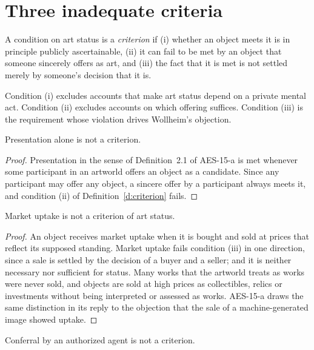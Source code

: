 \documentclass{situationist-preprint}
\begin{document}
\section{Three inadequate criteria}

\begin{definition}\label{d:criterion}
A condition on art status is a \emph{criterion} if (i) whether an object meets it is in principle publicly ascertainable, (ii) it can fail to be met by an object that someone sincerely offers as art, and (iii) the fact that it is met is not settled merely by someone's decision that it is.
\end{definition}

Condition (i) excludes accounts that make art status depend on a private mental act. Condition (ii) excludes accounts on which offering suffices. Condition (iii) is the requirement whose violation drives Wollheim's objection.

\begin{proposition}\label{p:pres}
Presentation alone is not a criterion.
\end{proposition}

\begin{proof}
Presentation in the sense of Definition~2.1 of AES-15-a is met whenever some participant in an artworld offers an object as a candidate. Since any participant may offer any object, a sincere offer by a participant always meets it, and condition (ii) of Definition~\ref{d:criterion} fails.
\end{proof}

\begin{proposition}\label{p:market}
Market uptake is not a criterion of art status.
\end{proposition}

\begin{proof}
An object receives market uptake when it is bought and sold at prices that reflect its supposed standing. Market uptake fails condition (iii) in one direction, since a sale is settled by the decision of a buyer and a seller; and it is neither necessary nor sufficient for status. Many works that the artworld treats as works were never sold, and objects are sold at high prices as collectibles, relics or investments without being interpreted or assessed as works. AES-15-a draws the same distinction in its reply to the objection that the sale of a machine-generated image showed uptake.
\end{proof}

\begin{proposition}\label{p:confer}
Conferral by an authorized agent is not a criterion.
\end{proposition}
\end{document}
